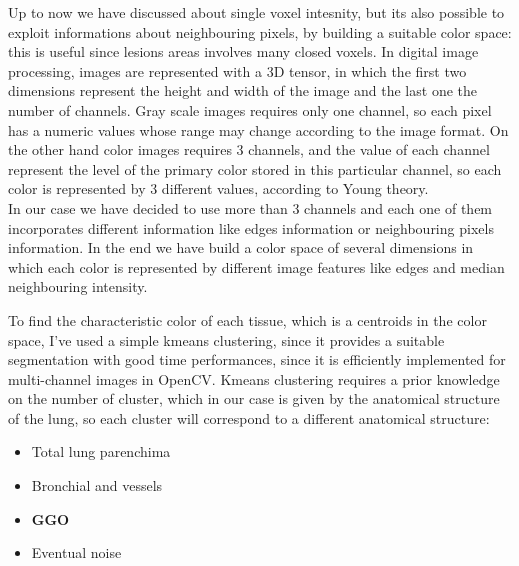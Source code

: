 \documentclass{standalone}
\begin{document}
	
	
	Up to now we have discussed about single voxel intesnity, but its also possible to exploit informations about neighbouring pixels, by building a suitable color space: this is useful since lesions areas involves many closed voxels. 
	In digital image processing, images are represented with a 3D tensor, in which the first two dimensions represent the height and width of the image 
	and the last one the number of channels. Gray scale images requires only one channel, so each pixel has a numeric values whose range may change 
	according to the image format. On the other hand color images requires 3 channels, and the value of each channel represent the level of the primary 
	color stored in this particular channel, so each color is represented by 3 different values, according to Young theory. \\
	In our case we have decided to use more than 3 channels and each one of them incorporates different information like edges information or 
	neighbouring pixels information. In the end we have build a color space of several dimensions in which each color is represented by different image 
	features like edges and median neighbouring intensity. 
	
	To find the characteristic color of each tissue, which is a centroids in the color space, I've used a simple kmeans clustering, since it provides a suitable segmentation with good time performances, since it is efficiently implemented for multi-channel images in OpenCV. 
	Kmeans clustering requires a prior knowledge on the number of cluster, which in our case is given by the anatomical structure of the lung, so each cluster will correspond to a different anatomical structure: 
	\begin{itemize}
		\item Total lung parenchima
		\item Bronchial and vessels
		\item \textbf{GGO}
		\item Eventual noise
	\end{itemize}

	



	
	
	
	

	
	
\end{document}
